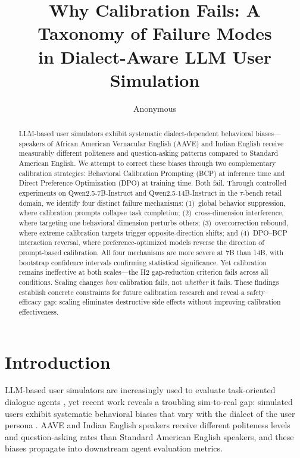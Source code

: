 \documentclass[11pt,a4paper]{article}
\title{Why Calibration Fails: A Taxonomy of Failure Modes\\in Dialect-Aware LLM User Simulation}
\author{Anonymous}
\date{}
\begin{document}
\maketitle

\begin{abstract}
LLM-based user simulators exhibit systematic dialect-dependent behavioral biases---speakers of African American Vernacular English (AAVE) and Indian English receive measurably different politeness and question-asking patterns compared to Standard American English.
We attempt to correct these biases through two complementary calibration strategies: Behavioral Calibration Prompting (BCP) at inference time and Direct Preference Optimization (DPO) at training time.
Both fail.
Through controlled experiments on Qwen2.5-7B-Instruct and Qwen2.5-14B-Instruct in the $\tau$-bench retail domain, we identify four distinct failure mechanisms: (1)~global behavior suppression, where calibration prompts collapse task completion; (2)~cross-dimension interference, where targeting one behavioral dimension perturbs others; (3)~overcorrection rebound, where extreme calibration targets trigger opposite-direction shifts; and (4)~DPO--BCP interaction reversal, where preference-optimized models reverse the direction of prompt-based calibration.
All four mechanisms are more severe at 7B than 14B, with bootstrap confidence intervals confirming statistical significance.
Yet calibration remains ineffective at both scales---the H2 gap-reduction criterion fails across all conditions.
Scaling changes \emph{how} calibration fails, not \emph{whether} it fails.
These findings establish concrete constraints for future calibration research and reveal a safety--efficacy gap: scaling eliminates destructive side effects without improving calibration effectiveness.
\end{abstract}

\section{Introduction}
\label{sec:intro}

LLM-based user simulators are increasingly used to evaluate task-oriented dialogue agents \citep{yao2024taubench}, yet recent work reveals a troubling sim-to-real gap: simulated users exhibit systematic behavioral biases that vary with the dialect of the user persona \citep{sim2real2026gap, seshadri2026lost}.
AAVE and Indian English speakers receive different politeness levels and question-asking rates than Standard American English speakers, and these biases propagate into downstream agent evaluation metrics.
\end{document}
